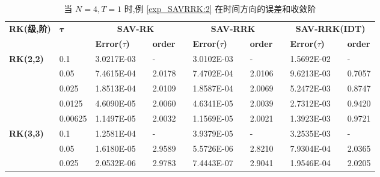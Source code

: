 \documentclass[aspectratio=169]{beamer}
\numberwithin{theorem}{section} %
\begin{document}
\begin{frame}%
	\begin{table}[H]\scriptsize
		\centering
		\caption{当 $N=4, T = 1$ 时,例 \ref{exp_SAVRRK:2} 在时间方向的误差和收敛阶}
		\begin{tabular}{lllllrlrlrlrlrl}
		\toprule
		\multicolumn{2}{l}{\multirow{2}[3]{*}{\textbf{RK(级,阶)}}} & \multicolumn{2}{l}{\multirow{2}[3]{*}{$\bm{\tau}$}} & \multicolumn{3}{c}{\textbf{SAV-RK}} &       & \multicolumn{3}{c}{\textbf{SAV-RRK}} &       & \multicolumn{3}{c}{\textbf{SAV-RRK(IDT)}} \\
		\cmidrule{5-7}\cmidrule{9-11}\cmidrule{13-15}    \multicolumn{2}{l}{} & \multicolumn{2}{l}{} & \textbf{Error($\tau$)} &       & \textbf{order} &       & \textbf{Error($\tau$)} &       & \textbf{order} &       & \textbf{Error($\tau$)} &       & \textbf{order} \\
		\hline
		\multicolumn{2}{l}{\multirow{5}[0]{*}{\textbf{RK(2,2)}}} & \multicolumn{2}{l}{0.1} & 3.0217E-03 &       & -     &       & 3.0102E-03 &       & -     &       & 1.5692E-02 &       & - \\
		\multicolumn{2}{l}{} & \multicolumn{2}{l}{0.05} & 7.4615E-04 &       & 2.0178  &       & 7.4702E-04 &       & 2.0106  &       & 9.6213E-03 &       & 0.7057  \\
		\multicolumn{2}{l}{} & \multicolumn{2}{l}{0.025} & 1.8513E-04 &       & 2.0109  &       & 1.8587E-04 &       & 2.0069  &       & 5.2472E-03 &       & 0.8747  \\
		\multicolumn{2}{l}{} & \multicolumn{2}{l}{0.0125} & 4.6090E-05 &       & 2.0060  &       & 4.6341E-05 &       & 2.0039  &       & 2.7312E-03 &       & 0.9420  \\
		\multicolumn{2}{l}{} & \multicolumn{2}{l}{0.00625} & 1.1497E-05 &       & 2.0032  &       & 1.1569E-05 &       & 2.0021  &       & 1.3923E-03 &       & 0.9721  \\
		\multicolumn{2}{l}{\multirow{5}[0]{*}{\textbf{RK(3,3)}}} & \multicolumn{2}{l}{0.1} & 1.2581E-04 &       & -     &       & 3.9379E-05 &       & -     &       & 3.2535E-03 &       & - \\
		\multicolumn{2}{l}{} & \multicolumn{2}{l}{0.05} & 1.6180E-05 &       & 2.9589  &       & 5.5726E-06 &       & 2.8210  &       & 7.9304E-04 &       & 2.0365  \\
		\multicolumn{2}{l}{} & \multicolumn{2}{l}{0.025} & 2.0532E-06 &       & 2.9783  &       & 7.4443E-07 &       & 2.9041  &       & 1.9546E-04 &       & 2.0205  \\

\end{tabular}
\end{table}
\end{frame}
\end{document}
